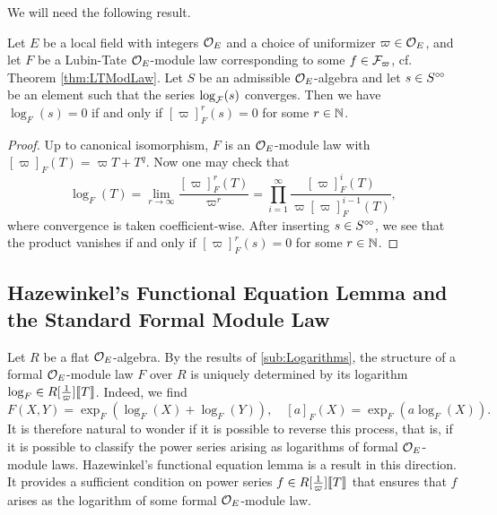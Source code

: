\documentclass[../main.tex]{subfiles}
\begin{document}
We will need the following result.
\begin{lem}\label{lem:KernelOfLog}
  Let $E$ be a local field with integers $\mathcal{O}_E$ and a choice of uniformizer $\varpi \in \mathcal{O}_E$, 
  and let $F$ be a Lubin-Tate $\mathcal{O}_E$-module law corresponding to some 
  $f \in \mathcal{F}_\varpi$, cf. Theorem \ref{thm:LTModLaw}. Let $S$ be an admissible 
  $\mathcal{O}_E$-algebra and let $s \in S^{\circ \hspace{-0.5pt} \circ}$ be an element such that the
  series $\log_{\mathcal{F}}(s)$ 
  converges. Then we have $\log_F(s) = 0$ if and only if $[\varpi]^r_F(s) = 0$ for
  some $r \in \mathbb{N}$. 
\begin{proof}
  Up to canonical isomorphism, $F$ is an $\mathcal{O}_E$-module law with $[\varpi]_F(T) =
  \varpi T + T^q$. Now one may check that 
  \begin{equation*}
    \log_F(T) = \lim_{r \to \infty} \frac{ [\varpi]_F^r(T) }{\varpi^r} = \prod_{i=1}^\infty 
    \frac{[\varpi]^i_F(T)}{\varpi [\varpi]^{i-1}_F(T)},
  \end{equation*}
  where convergence is taken coefficient-wise. After inserting
  $s \in S^{\circ \hspace{-0.5pt} \circ}$, we see that the product vanishes if and only if $[\varpi]_F^r(s) = 0$
  for some $r \in \mathbb{N}$. 
\end{proof}
\end{lem}

\subsection{Hazewinkel's Functional Equation Lemma and the Standard Formal Module Law} %
\label{sub:Hazewinkels FuncEq and the Standard Formal Module}
Let $R$ be a flat $\mathcal{O}_E$-algebra. By the results of \cref{sub:Logarithms}, the
structure of a formal 
$\mathcal{O}_E$-module law $F$ over $R$ is uniquely determined by its logarithm $\log_F
\in R [\tfrac 1\varpi] \llbracket T \rrbracket$. Indeed, we find
\begin{equation*}
  F(X,Y) = \exp_F(\log_F(X)+\log_F(Y)), \quad [a]_F(X) = \exp_F(a \log_F(X)).
\end{equation*}
It is therefore natural to wonder if it is possible to reverse this process, that
is, if it is possible to classify the power series arising as logarithms of 
formal $\mathcal{O}_E$-module laws.  Hazewinkel's 
functional equation lemma is a result in this direction. It provides a
sufficient condition on power series $f \in R[\tfrac 1 \varpi]\llbracket T \rrbracket$
that ensures that $f$ arises as the logarithm of some formal $\mathcal{O}_E$-module law.
\end{document}
